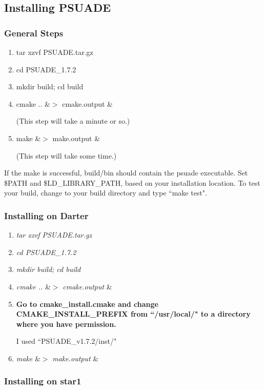 \subsection{Installing PSUADE}

\subsubsection{General Steps}

\begin{enumerate}
\item tar xzvf PSUADE.tar.gz
\item cd PSUADE\_1.7.2
\item mkdir build; cd build
\item cmake .. \&$>$ cmake.output \&

(This step will take a minute or so.)

\item make \&$>$ make.output \&

(This step will take some time.)
\end{enumerate}

If the make is successful, build/bin should contain the psuade executable. Set \$PATH and \$LD\_LIBRARY\_PATH, based on your installation location. To test your build, change to your build directory and type ``make test".


\subsubsection{Installing on Darter}

\begin{enumerate}
\item \textit{tar xzvf PSUADE.tar.gz}
\item \textit{cd PSUADE\_1.7.2}
\item \textit{mkdir build; cd build}
\item \textit{cmake ..} \&$>$ \textit{cmake.output} \&
\item {\bfseries Go to cmake\_install.cmake and change CMAKE\_INSTALL\_PREFIX from ``/usr/local/" to a directory where you have permission. }

I used ``PSUADE\_v1.7.2/inst/"

\item \textit{make} \&$>$ \textit{make.output} \&
\end{enumerate}

\subsubsection{Installing on star1}

